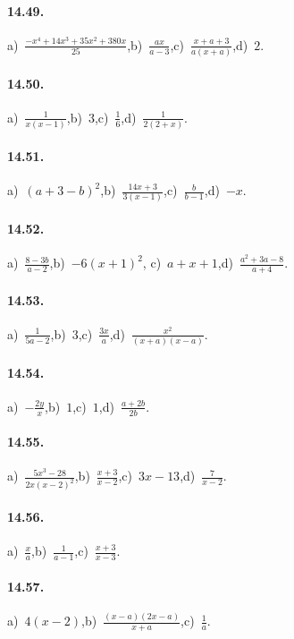 \paragraph{14.49.}
a)~$\frac{-x^4+14x^3+35x^2+380x}{25}$,\quad b)~$\frac{ax}{a-3}$,\quad c)~$\frac{x+a+3}{a(x+a)}$,\quad d)~$2$.

\paragraph{14.50.}
a)~$\frac{1}{x(x-1)}$,\quad b)~$3$,\quad c)~$\frac{1}{6}$,\quad d)~$\frac{1}{2(2+x)}$.

\paragraph{14.51.}
a)~$(a+3-b)^{2}$,\quad b)~$\frac{14x+3}{3(x-1)}$,\quad c)~$\frac{b}{b-1}$,\quad d)~$-x$.

\paragraph{14.52.}
a)~$\frac{8-3b}{a-2}$,\quad b)~$-6(x+1)^{2}$, \quad c)~$a+x+1$,\quad d)~$\frac{a^{2}+3a-8}{a+4}$.

\paragraph{14.53.}
a)~$\frac{1}{5a-2}$,\quad b)~$3$,\quad c)~$\frac{3x}{a}$,\quad d)~$\frac{x^{2}}{(x+a)(x-a)}$.

\paragraph{14.54.}
a)~$-\frac{2y}{x}$,\quad b)~$1$,\quad c)~$1$,\quad d)~$\frac{a+2b}{2b}$. %

\paragraph{14.55.}
a)~$\frac{5x^{3}-28}{2x(x-2)^{2}}$,\quad b)~$\frac{x+3}{x-2}$,\quad c)~$3x-13$,\quad d)~$\frac{7}{x-2}$.

\paragraph{14.56.}
a)~$\frac{x}{a}$,\quad b)~$\frac{1}{a-1}$,\quad c)~$\frac{x+3}{x-3}$.

\paragraph{14.57.}
a)~$4(x-2)$,\quad b)~$\frac{(x-a)(2x-a)}{x+a}$,\quad c)~$\frac{1}{a}$.

